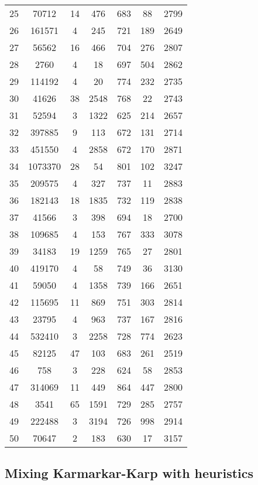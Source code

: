 \documentclass[tikz, 12pt]{scrartcl}
\begin{document}
\begin{longtable}{|c|cc|cc|cc|}
25	 &70712	 & 	14	 &476	 & 	683	 &88	 & 	2799\\
26	 &161571	 & 	4	 &245	 & 	721	 &189	 & 	2649\\
27	 &56562	 & 	16	 &466	 & 	704	 &276	 & 	2807\\
28	 &2760	 & 	4	 &18	 & 	697	 &504	 & 	2862\\
29	 &114192	 & 	4	 &20	 & 	774	 &232	 & 	2735\\
30	 &41626	 & 	38	 &2548	 & 	768	 &22	 & 	2743\\
31	 &52594	 & 	3	 &1322	 & 	625	 &214	 & 	2657\\
32	 &397885	 & 	9	 &113	 & 	672	 &131	 & 	2714\\
33	 &451550	 & 	4	 &2858	 & 	672	 &170	 & 	2871\\
34	 &1073370	 & 	28	 &54	 & 	801	 &102	 & 	3247\\
35	 &209575	 & 	4	 &327	 & 	737	 &11	 & 	2883\\
36	 &182143	 & 	18	 &1835	 & 	732	 &119	 & 	2838\\
37	 &41566	 & 	3	 &398	 & 	694	 &18	 & 	2700\\
38	 &109685	 & 	4	 &153	 & 	767	 &333	 & 	3078\\
39	 &34183	 & 	19	 &1259	 & 	765	 &27	 & 	2801\\
40	 &419170	 & 	4	 &58	 & 	749	 &36	 & 	3130\\
41	 &59050	 & 	4	 &1358	 & 	739	 &166	 & 	2651\\
42	 &115695	 & 	11	 &869	 & 	751	 &303	 & 	2814\\
43	 &23795	 & 	4	 &963	 & 	737	 &167	 & 	2816\\
44	 &532410	 & 	3	 &2258	 & 	728	 &774	 & 	2623\\
45	 &82125	 & 	47	 &103	 & 	683	 &261	 & 	2519\\
46	 &758	 & 	3	 &228	 & 	624	 &58	 & 	2853\\
47	 &314069	 & 	11	 &449	 & 	864	 &447	 & 	2800\\
48	 &3541	 & 	65	 &1591	 & 	729	 &285	 & 	2757\\
49	 &222488	 & 	3	 &3194	 & 	726	 &998	 & 	2914\\
50	 &70647	 & 	2	 &183	 & 	630	 &17	 & 	3157\\
\hline
\end{longtable}


\subsection{Mixing Karmarkar-Karp with heuristics}
\end{document}
